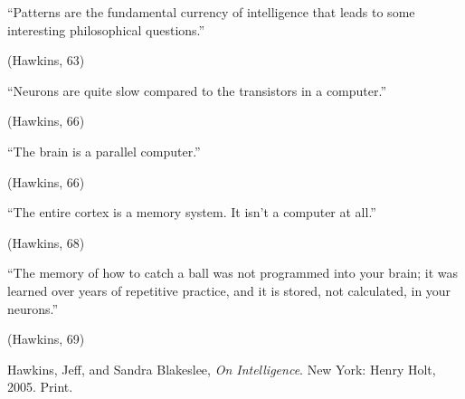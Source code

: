 \documentclass[11pt, oneside]{article}
\begin{document}
\epigraph{``Patterns are the fundamental currency of intelligence that leads to some interesting philosophical questions.''}{(Hawkins, 63)} 

\epigraph{``Neurons are quite slow compared to the transistors in a computer.''}{(Hawkins, 66)} 

\epigraph{``The brain is a parallel computer.''}{(Hawkins, 66)} 

\epigraph{``The entire cortex is a memory system. It isn't a computer at all.''}{(Hawkins, 68)} 

\epigraph{``The memory of how to catch a ball was not programmed into your brain; it was learned over years of repetitive practice, and it is stored, not calculated, in your neurons.''}{(Hawkins, 69)} 


\begin{thebibliography}{9}
  Hawkins, Jeff, and Sandra Blakeslee,
  \emph{On Intelligence}.
  New York: Henry Holt, 2005.
  Print.
\end{thebibliography}
\end{document}
